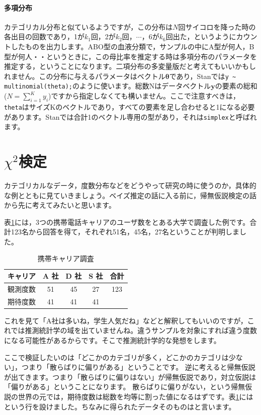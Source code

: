 \documentclass{ltjsbook}
\begin{document}
\paragraph{多項分布}
カテゴリカル分布と似ているようですが，この分布は$N$回サイコロを降った時の各出目の回数であり，1が$k_1$回，2が$k_2$回，$\cdots$，6が$k_6$回出た，というようにカウントしたものを出力します。ABO型の血液分類で，サンプルの中にA型が何人，B型が何人・・というときに，この母比率を推定する時は多項分布のパラメータを推定する，ということになります。二項分布の多変量版だと考えてもいいかもしれません\textcite{Matsuura201610}。この分布に与えるパラメータはベクトル$\bm{\theta}$であり，Stanでは\verb|y ~ multinomial(theta);|のように使います。総数Nはデータベクトル$\bm{y}$の要素の総和($N=\sum_{i=1}^K y_i$)ですから指定しなくても構いません。ここで注意すべきは，\verb|theta|はサイズKのベクトルであり，すべての要素を足し合わせると1になる必要があります。Stanでは合計1のベクトル専用の型があり，それは\verb|simplex|と呼ばれます。

\section{$\chi^2$検定}
カテゴリカルなデータ，度数分布などをどうやって研究の時に使うのか，具体的な例とともに見ていきましょう。ベイズ推定の話に入る前に，帰無仮説検定の話から先に考えてみたいと思います。

表\ref{tbl:23_01}には，3つの携帯電話キャリアのユーザ数をとある大学で調査した例です。合計123名から回答を得て，それぞれ51名，45名，27名ということが判明しました。
\begin{table}[ht]
	\centering
	\caption{携帯キャリア調査}
	\begin{tabular}{c|ccc|c}
		キャリア & A 社 & D 社 & S 社 & 合計  \\\hline
		観測度数 & 51  & 45  & 27  & 123 \\
		期待度数 & 41  & 41  & 41  &     \\
	\end{tabular}
	\label{tbl:23_01}
\end{table}
これを見て「A社は多いね，学生人気だね」などと解釈してもいいのですが，これでは推測統計学の域を出ていませんね。違うサンプルを対象にすれば違う度数になる可能性があるからです。そこで推測統計学的な発想をします。

ここで検証したいのは「どこかのカテゴリが多く，どこかのカテゴリは少ない」，つまり「散らばりに偏りがある」ということです。
逆に考えると帰無仮説が出てきます。つまり「散らばりに偏りはない」が帰無仮説であり，対立仮説は「偏りがある」ということになります。
散らばりに偏りがない，という帰無仮説の世界の元では，期待度数は総数を均等に割った値になるはずです。表\ref{tbl:23_01}にはという行を設けました。ちなみに得られたデータそのものはと言います。
\end{document}
